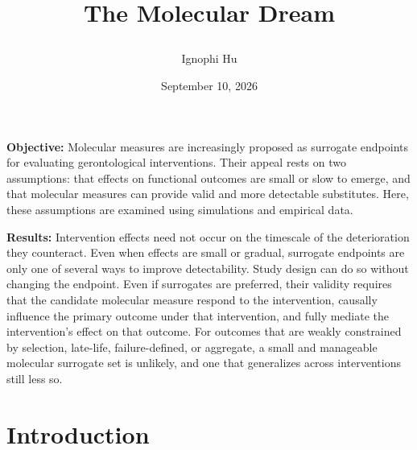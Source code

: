 \documentclass[twocolumn]{article} %
\title{\parbox{\linewidth}{\centering \textbf{The Molecular Dream}}}
\author{Ignophi Hu}
\date{September 10, 2026}
\begin{document}
\maketitle


\begin{tcolorbox}
\textbf{Objective:} Molecular measures are increasingly proposed as surrogate endpoints for evaluating gerontological interventions. Their appeal rests on two assumptions: that effects on functional outcomes are small or slow to emerge, and that molecular measures can provide valid and more detectable substitutes. Here, these assumptions are examined using simulations and empirical data.\newline

\textbf{Results:} Intervention effects need not occur on the timescale of the deterioration they counteract. Even when effects are small or gradual, surrogate endpoints are only one of several ways to improve detectability. Study design can do so without changing the endpoint. Even if surrogates are preferred, their validity requires that the candidate molecular measure respond to the intervention, causally influence the primary outcome under that intervention, and fully mediate the intervention's effect on that outcome. For outcomes that are weakly constrained by selection, late-life, failure-defined, or aggregate, a small and manageable molecular surrogate set is unlikely, and one that generalizes across interventions still less so.
\end{tcolorbox}

\tableofcontents

\section{Introduction}
\end{document}
